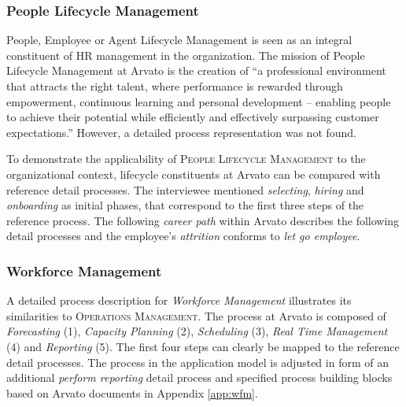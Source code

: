 	 
	\subsubsection{People Lifecycle Management}
	People, Employee or Agent Lifecycle Management is seen as an integral constituent of HR management in the organization. The mission of People Lifecycle Management at Arvato is the creation of \enquote{a professional environment that attracts the right talent, where performance is rewarded through empowerment, continuous learning and personal development – enabling people to achieve their potential while efficiently and effectively surpassing customer expectations.} However, a detailed process representation was not found. 
	
	To demonstrate the applicability of \textsc{People Lifecycle Management} to the organizational context, lifecycle constituents at Arvato can be compared with reference detail processes. The interviewee mentioned \textit{selecting}, \textit{hiring} and \textit{onboarding} as initial phases, that correspond to the first three steps of the reference process. The following \textit{career path} within Arvato describes the following detail processes and the employee's \textit{attrition} conforms to \textit{let go employee}.
	
	\subsubsection{Workforce Management}
	
	A detailed process description for \textit{Workforce Management} illustrates its similarities to \textsc{Operations Management}. The process at Arvato is composed of \textit{Forecasting} (1), \textit{Capacity Planning} (2), \textit{Scheduling} (3), \textit{Real Time Management} (4) and \textit{Reporting} (5). The first four steps can clearly be mapped to the reference detail processes. The process in the application model is adjusted in form of an additional \textit{perform reporting} detail process and specified process building blocks based on Arvato documents in Appendix \ref{app:wfm}.
	
	
	

	
	
